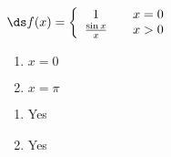 {$\ds f(x) = \left\{\begin{array}{ccc} 
1		& & x=0\\
\frac{\sin x}{x} & & x>0
\end{array}\right.
$
\begin{enumerate}
\item		$x=0$
\item		$x=\pi$
\end{enumerate}
}
{\begin{enumerate}
\item		Yes
\item		Yes
\end{enumerate}
}
